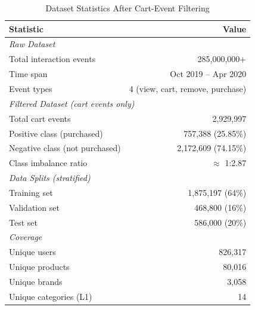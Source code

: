 \documentclass[conference]{IEEEtran}
\begin{document}
\begin{table}[htbp]
\caption{Dataset Statistics After Cart-Event Filtering}
\label{tab:dataset_stats}
\centering
\begin{tabular}{lr}
\toprule
\textbf{Statistic} & \textbf{Value} \\
\midrule
\multicolumn{2}{l}{\textit{Raw Dataset}} \\
\quad Total interaction events    & 285,000,000+ \\
\quad Time span                   & Oct 2019 -- Apr 2020 \\
\quad Event types                 & 4 (view, cart, remove, purchase) \\
\midrule
\multicolumn{2}{l}{\textit{Filtered Dataset (cart events only)}} \\
\quad Total cart events           & 2,929,997 \\
\quad Positive class (purchased)  & 757,388 \quad (25.85\%) \\
\quad Negative class (not purchased) & 2,172,609 \quad (74.15\%) \\
\quad Class imbalance ratio       & $\approx$ 1:2.87 \\
\midrule
\multicolumn{2}{l}{\textit{Data Splits (stratified)}} \\
\quad Training set                & 1,875,197 \quad (64\%) \\
\quad Validation set              & 468,800   \quad (16\%) \\
\quad Test set                    & 586,000   \quad (20\%) \\
\midrule
\multicolumn{2}{l}{\textit{Coverage}} \\
\quad Unique users                & 826,317 \\
\quad Unique products             & 80,016 \\
\quad Unique brands               & 3,058 \\
\quad Unique categories (L1)      & 14 \\
\bottomrule
\end{tabular}
\end{table}
\end{document}
